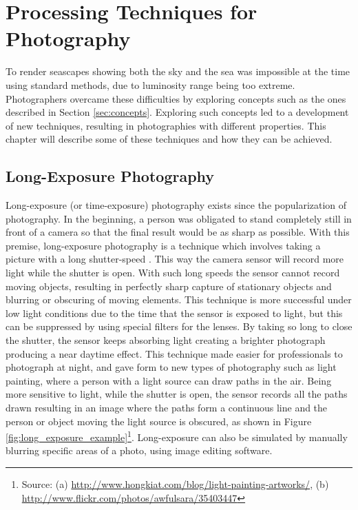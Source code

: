 \section{Processing Techniques for Photography}
\label{sub:photo_techniques}

To render seascapes showing both the sky and the sea was impossible at the time using standard methods, due to luminosity range being too extreme. Photographers overcame these difficulties by exploring concepts such as the ones described in Section \ref{sec:concepts}. Exploring such concepts led to a development of new techniques, resulting in photographies with different properties. This chapter will describe some of these techniques and how they can be achieved.

\subsection{Long-Exposure Photography}

Long-exposure (or time-exposure) photography exists since the popularization of photography. In the beginning, a person was obligated to stand completely still in front of a camera so that the final result would be as sharp as possible.
With this premise, long-exposure photography is a technique which involves taking a picture with a long shutter-speed \cite{kamps2012rules}. This way the camera sensor will record more light while the shutter is open. With such long speeds the sensor cannot record moving objects, resulting in perfectly sharp capture of stationary objects and blurring or obscuring of moving elements.
This technique is more successful under low light conditions due to the time that the sensor is exposed to light, but this can be suppressed by using special filters for the lenses. By taking so long to close the shutter, the sensor keeps absorbing light creating a brighter photograph producing a near daytime effect.
This technique made easier for professionals to photograph at night, and gave form to new types of photography such as light painting, where a person with a light source can draw paths in the air. Being more sensitive to light, while the shutter is open, the sensor records all the paths drawn resulting in an image where the paths form a continuous line and the person or object moving the light source is obscured, as shown in Figure \ref{fig:long_exposure_example}\footnote{Source: (a) \url{http://www.hongkiat.com/blog/light-painting-artworks/}, (b) \url{http://www.flickr.com/photos/awfulsara/35403447}}. Long-exposure can also be simulated by manually blurring specific areas of a photo, using image editing software.

